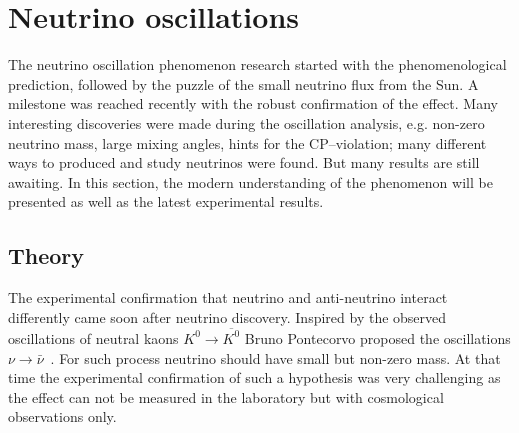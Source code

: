 \documentclass[../main.tex]{subfiles}
\begin{document}




\section{Neutrino oscillations}
\label{sec:intro:osc}
The neutrino oscillation phenomenon research started with the phenomenological prediction, followed by the puzzle of the small neutrino flux from the Sun. A milestone was reached recently with the robust confirmation of the effect. Many interesting discoveries were made during the oscillation analysis, e.g. non-zero neutrino mass, large mixing angles, hints for the CP--violation; many different ways to produced and study neutrinos were found. But many results are still awaiting. In this section, the modern understanding of the phenomenon will be presented as well as the latest experimental results.

\subsection{Theory}
The experimental confirmation that neutrino and anti-neutrino interact differently came soon after neutrino discovery. Inspired by the observed oscillations of neutral kaons $K^0\to\overline{K^0}$ Bruno Pontecorvo proposed the oscillations $\nu\to\bar\nu$~\cite{Pontecorvo1957}. For such process neutrino should have small but non-zero mass. At that time the experimental confirmation of such a hypothesis was very challenging as the effect can not be measured in the laboratory but with cosmological observations only.
\end{document}
